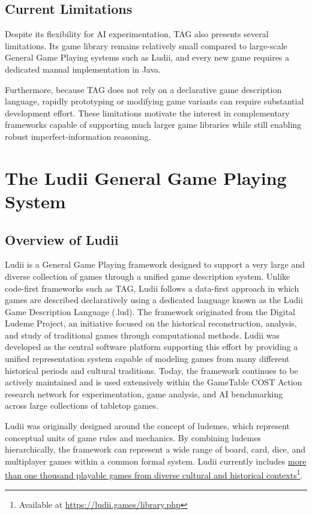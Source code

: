 \subsection{Current Limitations}
Despite its flexibility for AI experimentation, TAG also presents several limitations. Its game library remains relatively small compared to large-scale General Game Playing systems such as Ludii, and every new game requires a dedicated manual implementation in Java.

Furthermore, because TAG does not rely on a declarative game description language, rapidly prototyping or modifying game variants can require substantial development effort. These limitations motivate the interest in complementary frameworks capable of supporting much larger game libraries while still enabling robust imperfect-information reasoning.


\section{The Ludii General Game Playing System}
\subsection{Overview of Ludii}
Ludii\cite{piette2020ludii} is a General Game Playing framework designed to support a very large and diverse collection of games through a unified game description system\cite{piette2020ludii}. Unlike code-first frameworks such as TAG, Ludii follows a data-first approach in which games are described declaratively using a dedicated language known as the Ludii Game Description Language (.lud)\cite{browne2020ludii_language}. The framework originated from the Digital Ludeme Project\cite{browne2022dlpworkshop}, an initiative focused on the historical reconstruction, analysis, and study of traditional games through computational methods. Ludii was developed as the central software platform supporting this effort by providing a unified representation system capable of modeling games from many different historical periods and cultural traditions\cite{crist2024ludii_database}. Today, the framework continues to be actively maintained and is used extensively within the GameTable COST Action research network\cite{piette2024gametable_kickoff} for experimentation, game analysis, and AI benchmarking across large collections of tabletop games\cite{browne2023ludii}.

Ludii was originally designed around the concept of ludemes, which represent conceptual units of game rules and mechanics\cite{piette2021concepts}. By combining ludemes hierarchically, the framework can represent a wide range of board, card, dice, and multiplayer games within a common formal system. Ludii currently includes \hyperlink{https://ludii.games/library.php}{more than one thousand playable games from diverse cultural and historical contexts}\footnote{Available at \url{https://ludii.games/library.php}}.

